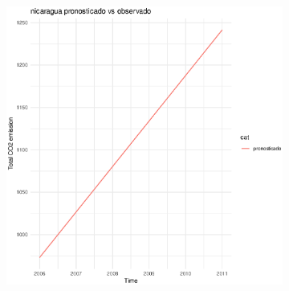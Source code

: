 \documentclass[twocolumn]{article}
\begin{document}
\begin{figure}
\begin{subfigure}{.3\textwidth}
        \end{subfigure}
        \hspace*{\fill}
        \begin{subfigure}{.3\textwidth}
            \includegraphics[width=\linewidth]{images/nicaragua_imputation.eps}
        \end{subfigure}\\      


\end{figure}
\end{document}

